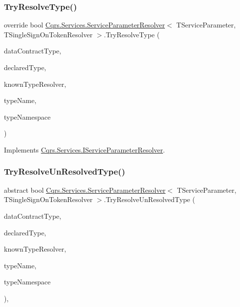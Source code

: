 \subsubsection{\texorpdfstring{Try\+Resolve\+Type()}{TryResolveType()}}
{\footnotesize\ttfamily override bool \hyperlink{classCqrs_1_1Services_1_1ServiceParameterResolver}{Cqrs.\+Services.\+Service\+Parameter\+Resolver}$<$ T\+Service\+Parameter, T\+Single\+Sign\+On\+Token\+Resolver $>$.Try\+Resolve\+Type (\begin{DoxyParamCaption}\item[{Type}]{data\+Contract\+Type,  }\item[{Type}]{declared\+Type,  }\item[{Data\+Contract\+Resolver}]{known\+Type\+Resolver,  }\item[{out Xml\+Dictionary\+String}]{type\+Name,  }\item[{out Xml\+Dictionary\+String}]{type\+Namespace }\end{DoxyParamCaption})}



Implements \hyperlink{interfaceCqrs_1_1Services_1_1IServiceParameterResolver_a31c82a00b192b877faff6df99e1b689b_a31c82a00b192b877faff6df99e1b689b}{Cqrs.\+Services.\+I\+Service\+Parameter\+Resolver}.

\mbox{\label{classCqrs_1_1Services_1_1ServiceParameterResolver_a943e9bb30a085ba6783f6f8a2aa73315_a943e9bb30a085ba6783f6f8a2aa73315}} 
\subsubsection{\texorpdfstring{Try\+Resolve\+Un\+Resolved\+Type()}{TryResolveUnResolvedType()}}
{\footnotesize\ttfamily abstract bool \hyperlink{classCqrs_1_1Services_1_1ServiceParameterResolver}{Cqrs.\+Services.\+Service\+Parameter\+Resolver}$<$ T\+Service\+Parameter, T\+Single\+Sign\+On\+Token\+Resolver $>$.Try\+Resolve\+Un\+Resolved\+Type (\begin{DoxyParamCaption}\item[{Type}]{data\+Contract\+Type,  }\item[{Type}]{declared\+Type,  }\item[{Data\+Contract\+Resolver}]{known\+Type\+Resolver,  }\item[{ref Xml\+Dictionary\+String}]{type\+Name,  }\item[{ref Xml\+Dictionary\+String}]{type\+Namespace }\end{DoxyParamCaption})\hspace{0.3cm}{\ttfamily [protected]}, {}}



